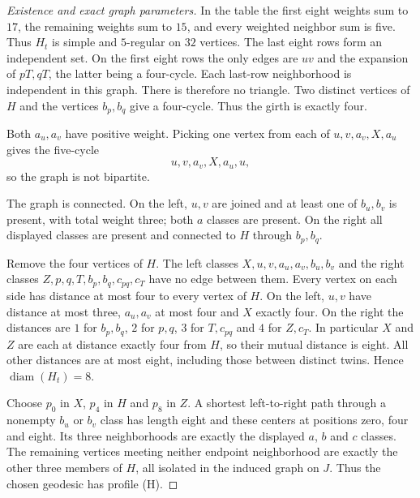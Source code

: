 \documentclass[11pt]{article}
\begin{document}
\begin{proof}[Existence and exact graph parameters]
In the table the first eight weights sum to $17$, the remaining
weights sum to $15$, and every weighted neighbor sum is five.
Thus $H_t$ is simple and $5$-regular on $32$ vertices. The last
eight rows form an independent set. On the first eight rows the only
edges are $uv$ and the expansion of $pT,qT$, the latter being a
four-cycle. Each last-row neighborhood is independent in this graph.
There is therefore no triangle. Two distinct vertices of $H$ and the
vertices $b_p,b_q$ give a four-cycle. Thus the girth is exactly four.

Both $a_u,a_v$ have positive weight. Picking one vertex from each of
$u,v,a_v,X,a_u$ gives the five-cycle
\[
 u,v,a_v,X,a_u,u,
\]
so the graph is not bipartite.

The graph is connected. On the left, $u,v$ are joined and at least
one of $b_u,b_v$ is present, with total weight three; both $a$ classes
are present. On the right all displayed classes are present and
connected to $H$ through $b_p,b_q$.

Remove the four vertices of $H$. The left classes
$X,u,v,a_u,a_v,b_u,b_v$ and the right classes
$Z,p,q,T,b_p,b_q,c_{pq},c_T$ have no edge between them.
Every vertex on each side has distance at most four to every vertex
of $H$. On the left, $u,v$ have distance at most three, $a_u,a_v$
at most four and $X$ exactly four. On the right the distances are
$1$ for $b_p,b_q$, $2$ for $p,q$, $3$ for $T,c_{pq}$ and $4$ for
$Z,c_T$. In particular $X$ and $Z$ are each at distance exactly four
from $H$, so their mutual distance is eight. All other distances
are at most eight, including those between distinct twins. Hence
$\operatorname{diam}(H_t)=8$.

Choose $p_0$ in $X$, $p_4$ in $H$ and $p_8$ in $Z$. A shortest
left-to-right path through a nonempty $b_u$ or $b_v$ class has length
eight and these centers at positions zero, four and eight. Its three
neighborhoods are exactly the displayed $a$, $b$ and $c$ classes.
The remaining vertices meeting neither endpoint neighborhood are
exactly the other three members of $H$, all isolated in the induced
graph on $J$. Thus the chosen geodesic has profile \textup{(H)}.
\end{proof}
\end{document}
